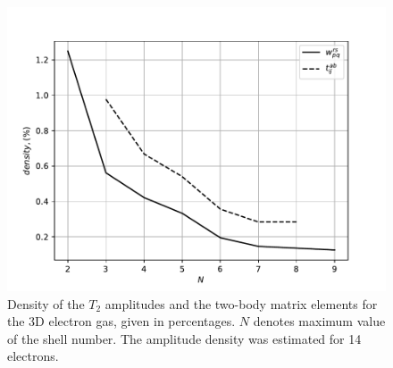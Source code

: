 \documentclass[twoside,english]{uiofysmaster}
\begin{document}
\begin{figure}[ht!]
	\centering
	\includegraphics[width=0.7\linewidth]{density}
	\caption{Density of the $T_2$ amplitudes and the two-body matrix elements for the 3D electron gas, given in percentages. $N$ denotes maximum value of the shell number. The amplitude density was estimated for 14 electrons.}
	\label{fig:density}
\end{figure}
\end{document}
